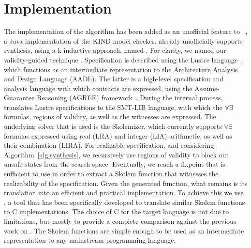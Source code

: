 \section{Implementation}
\label{sec:impl}

The implementation of the algorithm has been added as an
unofficial feature to \jkind~\cite{jkind}, a Java implementation of the
\textsc{KIND} model checker. \jkind already unofficially supports synthesis,
using a k-inductive approach, named \jsyn. For clarity, we named
our validity-guided technique \jsynvg. Specification is described using the
Lustre language~\cite{lustrev6}, which functions as an intermediate representation to the Architecture Analysis and Design Language (\textsc{AADL}).
The latter is a high-level specification and analysis language with which
contracts are expressed, using the Assume-Guarantee Reasoning (\textsc{AGREE})
framework~\cite{NFM2012:CoGaMiWhLaLu}.
During the internal process, \jsynvg translates Lustre specifications to
the SMT-LIB language, with which the $\forall\exists$ formulas, regions of
validity, as well as the witnesses are expressed. The underlying solver that is
used is the \aeval Skolemizer, which currently supports $\forall\exists$
formulas expressed using real (LRA) and integer (LIA) arithmetic, as well as
their combination (LIRA).
%
For realizable specification, and considering Algorithm~\ref{alg:synthesis}, we
recursively use regions of validity to block out unsafe states from the search
space.
Eventually, we reach a fixpoint that is sufficient to use in order to extract
a Skolem function that witnesses the realizability of the specification. Given
the generated function, what remains is its translation
into an efficient and practical implementation. To achieve this we use
\smtlibtoc, a tool that has been specifically developed to translate
similar \aeval Skolem functions to C implementations. The choice of C for
the target language is not due to limitations, but mostly to provide a complete
comparison against the previous work on \jsyn.
The Skolem functions are simple enough to be used as an intermediate
representation to any mainstream programming language.




